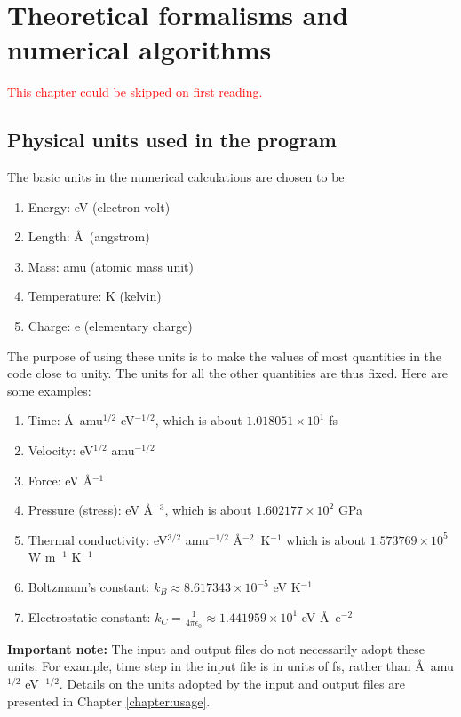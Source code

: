 \documentclass[12pt,a4paper]{report}
\begin{document}
\chapter{Theoretical formalisms and numerical algorithms\label{chapter:theory}}

\textcolor{red}{This chapter could be skipped on first reading.}

\section{Physical units used in the program}

The basic units in the numerical calculations are chosen to be
\begin{enumerate}
\item Energy: eV (electron volt)
\item Length: \AA~(angstrom)
\item Mass: amu (atomic mass unit)
\item Temperature: K (kelvin)
\item Charge: e (elementary charge)
\end{enumerate}
The purpose of using these units is to make the values of most quantities in the code close to unity. The units for all the other quantities are thus fixed. Here are some examples:
\begin{enumerate}
\item Time: \AA~amu$^{1/2}$ eV$^{-1/2}$, which is about $1.018051 \times 10^{1}$ fs
\item Velocity: eV$^{1/2}$ amu$^{-1/2}$
\item Force: eV \AA$^{-1}$
\item Pressure (stress): eV \AA$^{-3}$, which is about $1.602177 \times 10^{2}$ GPa
\item Thermal conductivity: eV$^{3/2}$ amu$^{-1/2}$ \AA$^{-2}$~K$^{-1}$
      which is about $1.573769 \times 10^{5}$ W m$^{-1}$ K$^{-1}$
\item Boltzmann's constant: $k_B \approx 8.617343 \times 10^{-5}$ eV K$^{-1}$
\item Electrostatic constant:
$k_C = \frac{1}{4\pi\epsilon_0} \approx 1.441959 \times 10^{1}$ eV \AA~e$^{-2}$
\end{enumerate}

\textbf{Important note:}
The input and output files do not necessarily adopt these units. For example, time step in the input file is in units of fs, rather than \AA~amu$^{1/2}$ eV$^{-1/2}$. Details on the units adopted by the input and output files are presented in Chapter \ref{chapter:usage}.
\end{document}
